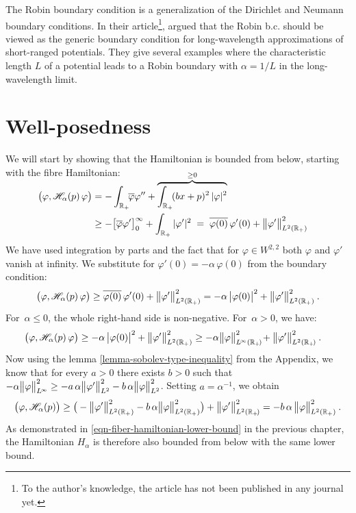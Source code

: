 \medskip

The Robin boundary condition is a generalization of the Dirichlet and Neumann boundary conditions. In their article\footnote{To the author's knowledge, the article has not been published in any journal yet.}, \cite{Allwright2016} argued that the Robin b.c. should be viewed as the generic boundary condition for long-wavelength approximations of short-ranged potentials. They give several examples where the characteristic length $L$ of a potential leads to a Robin boundary with $\alpha = 1/L$ in the long-wavelength limit.


\section{Well-posedness}
We will start by showing that the Hamiltonian is bounded from below, starting with the fibre Hamiltonian:
\begin{align*}
    \\[-2\baselineskip]
    \big( \varphi, \mathscr{H}_\alpha(p) \, \varphi \big)
    &= - \int_{\mathbb{R}_+} \!\! \overline\varphi \varphi''
    + \overbrace{\int_{\mathbb{R}_+} \! (bx + p)^2 \, |\varphi|^2}^{\geq 0}
    \\
    &\geq -\big[ \overline\varphi \varphi' \big]_0^{\infty}
    + \int_{\mathbb{R}_+} |\varphi'|^2
    \;=\;
    \overline{ \varphi(0) } \, \varphi'(0)
    + \big\lVert  \varphi'  \big\rVert_{L^2(\mathbb{R}_+)}^2
\end{align*}
We have used integration by parts and the fact that for $\varphi \in W^{2,2}$ both $\varphi$ and $\varphi'$ vanish at infinity. We substitute for $\varphi'(0) = -\alpha \, \varphi(0)$ from the boundary condition:
\begin{align*}
    \big( \varphi, \mathscr{H}_\alpha(p) \, \varphi \big)
    \geq \overline{ \varphi(0) } \, \varphi'(0)
    + \big\lVert  \varphi'  \big\rVert_{L^2(\mathbb{R}_+)}^2
    = - \alpha \, \big| \varphi(0) \big|^2
    + \big\lVert  \varphi'  \big\rVert_{L^2(\mathbb{R}_+)}^2
    \: .
\end{align*}
For~$\alpha \leq 0$, the whole right-hand side is non-negative. For~$\alpha > 0$, we have:
\begin{align*}
    &\big( \varphi, \mathscr{H}_\alpha(p) \, \varphi \big)
    \geq - \alpha \, \big| \varphi(0) \big|^2
    + \big\lVert  \varphi'  \big\rVert_{L^2(\mathbb{R}_+)}^2
    \geq -\alpha \big\lVert \varphi \big\rVert_{L^{\!\infty}(\mathbb{R}_+\!)}^2
    \! + \big\lVert  \varphi'  \big\rVert_{L^2(\mathbb{R}_+\!)}^2
    \: .
\end{align*}
Now using the lemma \ref{lemma-sobolev-type-inequality} from the Appendix, we know that for every $a>0$ there exists $b>0$ such that $-\alpha \big\lVert \varphi \big\rVert_{L^{\!\infty}}^2 \geq -a \, \alpha \big\lVert \varphi' \big\rVert_{L^2}^2 - b \, \alpha \big\lVert \varphi \big\rVert_{L^2}^2$. Setting $a = \alpha^{-1}$, we obtain
\begin{equation*}
    \big( \varphi, \mathscr{H}_\alpha(p) \big)
    \geq \big(
        -\big\lVert \varphi' \big\rVert_{L^2(\mathbb{R}_+)}^2
        - b \, \alpha \big\lVert \varphi \big\rVert_{L^2(\mathbb{R}_+)}^2
    \big)
     + \big\lVert  \varphi'  \big\rVert_{L^2(\mathbb{R}_+\!)}^2
    =
    - b \, \alpha \,
    \big\lVert \varphi \big\rVert_{L^2(\mathbb{R}_+)}^2
    \: .
\end{equation*}
As demonstrated in \eqref{eqn-fiber-hamiltonian-lower-bound} in the previous chapter, the Hamiltonian $H_\alpha$ is therefore also bounded from below with the same lower bound.

